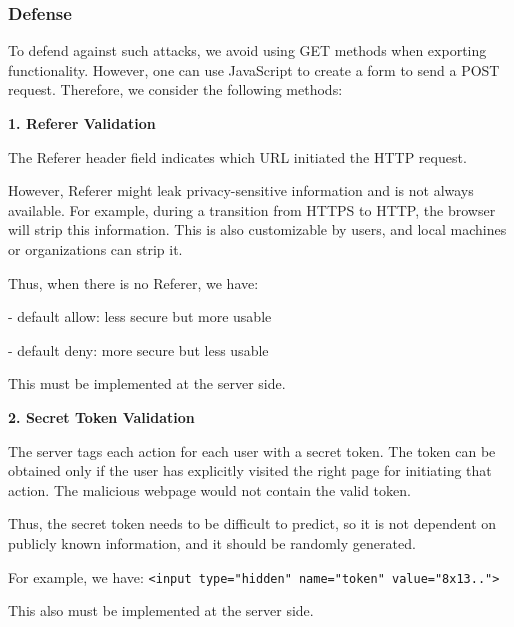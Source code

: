 \subsubsection{Defense}
To defend against such attacks, we avoid using GET methods when exporting functionality. However, one can use JavaScript to create a form to send a POST request. Therefore, we consider the following methods:

\textbf{1. Referer Validation} 

The Referer header field indicates which URL initiated the HTTP request. 

However, Referer might leak privacy-sensitive information and is not always available. For example, during a transition from HTTPS to HTTP, the browser will strip this information. This is also customizable by users, and local machines or organizations can strip it. 

Thus, when there is no Referer, we have:

- default allow: less secure but more usable  

- default deny: more secure but less usable  

This must be implemented at the server side. 

\textbf{2. Secret Token Validation} 

The server tags each action for each user with a secret token. The token can be obtained only if the user has explicitly visited the right page for initiating that action. The malicious webpage would not contain the valid token. 

Thus, the secret token needs to be difficult to predict, so it is not dependent on publicly known information, and it should be randomly generated. 

For example, we have: \texttt{<input type="hidden" name="token" value="8x13..">}

This also must be implemented at the server side.  